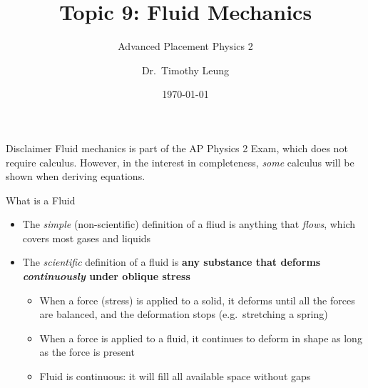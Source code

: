 \documentclass[12pt,aspectratio=169]{beamer}
\title{Topic 9: Fluid Mechanics}
\subtitle{Advanced Placement Physics 2}
\author[TML]{Dr.\ Timothy Leung}
\institute{Olympiads School}
\date{\today}
\begin{document}
\begin{frame}
  \maketitle
\end{frame}






\begin{frame}{Disclaimer}
  Fluid mechanics is part of the AP Physics 2 Exam, which does not require
  calculus. However, in the interest in completeness, \emph{some} calculus will
  be shown when deriving equations.
\end{frame}



\begin{frame}{What is a Fluid}
  \begin{itemize}
  \item The \emph{simple} (non-scientific) definition of a fliud is anything
    that \emph{flows}, which covers most gases and liquids
  \item\vspace{.1in}The \emph{scientific} definition of a fluid is \textbf{any
    substance that deforms \emph{continuously} under oblique stress}
    \begin{itemize}
    \item When a force (stress) is applied to a solid, it deforms until all the
      forces are balanced, and the deformation stops (e.g.\ stretching a spring)
    \item When a force is applied to a fluid, it continues to deform in shape as
      long as the force is present
    \item Fluid is continuous: it will fill all available space without gaps
    \end{itemize}
  \end{itemize}
\end{frame}
\end{document}
